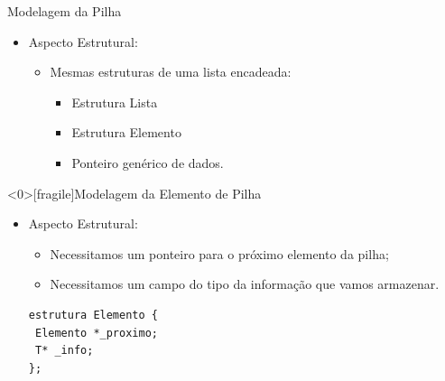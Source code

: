 \documentclass[12pt,table,xcolor={dvipsnames}]{beamer}
\begin{document}
\begin{frame}[fragile]{Modelagem da Pilha}

\begin{itemize}
\item Aspecto Estrutural:
\begin{itemize}
\item Mesmas estruturas de uma lista encadeada:
\begin{itemize}
\item Estrutura Lista
\item Estrutura Elemento
\item Ponteiro genérico de dados.
\end{itemize}
\end{itemize}
\end{itemize}
\end{frame}


\begin{frame}<0>[fragile]{Modelagem da Elemento de Pilha}

\begin{itemize}
\item Aspecto Estrutural:
\begin{itemize}
\item Necessitamos um ponteiro para o próximo elemento da pilha;
\item Necessitamos um campo do tipo da informação que vamos armazenar.
\end{itemize}
\begin{lstlisting}
estrutura Elemento {
 Elemento *_proximo;
 T* _info;
};
\end{lstlisting}
\end{itemize}
\end{frame}
\end{document}
